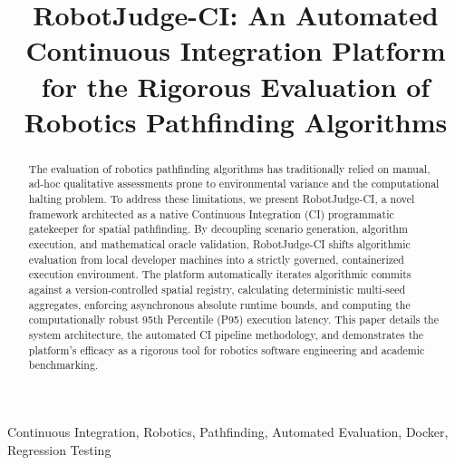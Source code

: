 \documentclass[conference]{IEEEtran}
\begin{document}
\title{RobotJudge-CI: An Automated Continuous Integration Platform for the Rigorous Evaluation of Robotics Pathfinding Algorithms\\
}

\author{
\and
{}
}

\maketitle

\begin{abstract}
The evaluation of robotics pathfinding algorithms has traditionally relied on manual, ad-hoc qualitative assessments prone to environmental variance and the computational halting problem. To address these limitations, we present RobotJudge-CI, a novel framework architected as a native Continuous Integration (CI) programmatic gatekeeper for spatial pathfinding. By decoupling scenario generation, algorithm execution, and mathematical oracle validation, RobotJudge-CI shifts algorithmic evaluation from local developer machines into a strictly governed, containerized execution environment. The platform automatically iterates algorithmic commits against a version-controlled spatial registry, calculating deterministic multi-seed aggregates, enforcing asynchronous absolute runtime bounds, and computing the computationally robust 95th Percentile (P95) execution latency. This paper details the system architecture, the automated CI pipeline methodology, and demonstrates the platform's efficacy as a rigorous tool for robotics software engineering and academic benchmarking.
\end{abstract}

\begin{IEEEkeywords}
Continuous Integration, Robotics, Pathfinding, Automated Evaluation, Docker, Regression Testing
\end{IEEEkeywords}
\end{document}
